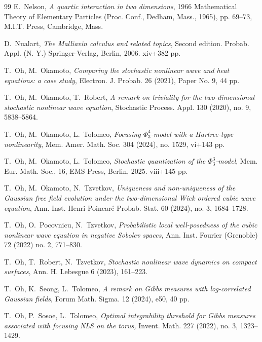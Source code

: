 \documentclass[letterpaper, 11pt,  reqno]{amsart}
\newcommand{\1}{\hspace{0.5mm}\text{I}\hspace{0.2mm}}
\numberwithin{equation}{section}
\numberwithin{theorem}{section}
\begin{document}
\begin{thebibliography}{99}
E.~Nelson, 
{\it A quartic interaction in two dimensions}, 
 1966 Mathematical Theory of Elementary Particles (Proc. Conf., Dedham, Mass., 1965), pp. 69--73, M.I.T. Press, Cambridge, Mass.
%


D.~Nualart,
{\it The Malliavin calculus and related topics}, 
Second edition.
Probab. Appl. (N. Y.)
Springer-Verlag, Berlin, 2006. xiv+382 pp.


T.~Oh, M.~Okamoto,
{\it Comparing the stochastic nonlinear wave and heat equations: a case study}, 
Electron. J. Probab. 26 (2021), Paper No. 9, 44 pp.



T.~Oh, M.~Okamoto, T.~Robert,
{\it A remark on triviality for the two-dimensional stochastic nonlinear wave equation},
 Stochastic Process. Appl. 130 (2020), no. 9, 5838--5864. 


T.~Oh, M.~Okamoto, L.~Tolomeo,
{\it Focusing $\Phi^4_3$-model with a Hartree-type nonlinearity}, 
Mem. Amer. Math. Soc. 304 (2024), no. 1529, vi+143 pp. 

T.~Oh, M.~Okamoto, L.~Tolomeo,
{\it Stochastic quantization of the $\Phi^3_3$-model},  
Mem. Eur. Math. Soc., 16,
EMS Press, Berlin, 2025. viii+145 pp. 



T.~Oh, M.~Okamoto, N.~Tzvetkov,
{\it Uniqueness and non-uniqueness of the Gaussian free field evolution under the two-dimensional Wick ordered cubic wave equation}, 
Ann. Inst. Henri Poincar\'e Probab. Stat. 60 (2024), no. 3, 1684--1728.


T.~Oh, O.~Pocovnicu, N.~Tzvetkov,
{\it Probabilistic local well-posedness of the cubic nonlinear wave equation in negative Sobolev spaces},
Ann. Inst. Fourier (Grenoble) 72 (2022) no. 2, 771--830. 


T.~Oh, T.~Robert, N.~Tzvetkov,
{\it Stochastic nonlinear wave dynamics on compact surfaces}, 
Ann. H. Lebesgue 6 (2023), 161--223.





T.~Oh, K.~Seong, L.~Tolomeo, 
{\it 
A remark on Gibbs measures with log-correlated Gaussian fields},
  Forum Math. Sigma.
12 (2024), e50,  40 pp.



T.~Oh, P.~Sosoe, L.~Tolomeo,
{\it  Optimal integrability threshold for Gibbs measures associated with focusing NLS on the torus,}
 Invent. Math. 227 (2022), no. 3, 1323--1429. 



\end{thebibliography}
\end{document}
